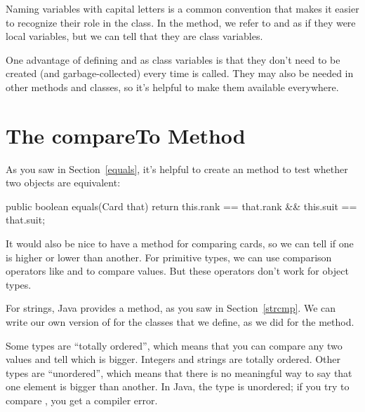 Naming  variables with capital letters is a common convention that makes it easier to recognize their role in the class.
In the  method, we refer to  and  as if they were local variables, but we can tell that they are class variables.

One advantage of defining  and  as class variables is that they don't need to be created (and garbage-collected) every time  is called.
They may also be needed in other methods and classes, so it's helpful to make them available everywhere.


\section{The compareTo Method}


As you saw in Section~\ref{equals}, it's helpful to create an  method to test whether two objects are equivalent:

\begin{code}
public boolean equals(Card that) {
    return this.rank == that.rank
        && this.suit == that.suit;
}
\end{code}


It would also be nice to have a method for comparing cards, so we can tell if one is higher or lower than another.
For primitive types, we can use comparison operators like \java{<} and \java{>} to compare values.
But these operators don't work for object types.

For strings, Java provides a  method, as you saw in Section~\ref{strcmp}.
We can write our own version of  for the classes that we define, as we did for the  method.


Some types are ``totally ordered'', which means that you can compare any two values and tell which is bigger.
Integers and strings are totally ordered.
Other types are ``unordered'', which means that there is no meaningful way to say that one element is bigger than another.
In Java, the  type is unordered; if you try to compare , you get a compiler error.

